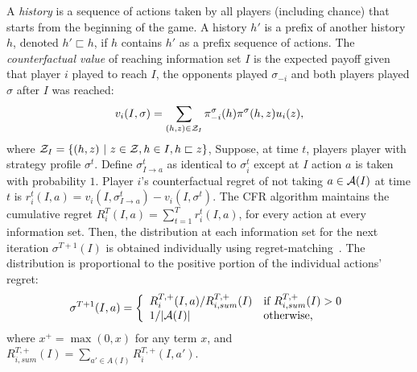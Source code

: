 A {\it history} is a sequence of actions taken by all players (including chance) that starts from the beginning of the game.
A history $h'$ is a prefix of another history $h$, denoted $h' \sqsubset h$, if $h$ contains $h'$ as a prefix sequence of actions.
The {\it counterfactual value} of reaching information set $I$ is the expected payoff given that player $i$ played to reach $I$, the opponents played
$\sigma_{-i}$ and both players played $\sigma$ after $I$ was reached:
\begin{equation}
\label{eq:cfv}
v_i(I,\sigma) = \sum_{(h,z) \in \mathcal{Z}_I} \pi^{\sigma}_{-i}(h) \pi^{\sigma}(h,z) u_i(z),
\end{equation}
where $\mathcal{Z}_I = \{ (h,z)~|~z \in \mathcal{Z}, h \in I, h \sqsubset z \}$, 
Suppose, at time $t$, players player with strategy profile $\sigma^t$.
Define $\sigma^t_{I \rightarrow a}$ as identical to $\sigma^t_i$ except at $I$ action $a$ is taken with probability $1$.
Player $i$'s counterfactual regret of not taking $a \in \mathcal{A}(I)$ at time $t$ is $r_i^t(I,a) = v_i(I, \sigma^t_{I \rightarrow a}) - v_i(I,\sigma^t)$.
The CFR algorithm maintains the cumulative regret $R_i^T(I,a) = \sum_{t=1}^T r_i^t(I,a)$, for every action at every information set.
Then, the distribution at each information set for the next iteration $\sigma^{T+1}(I)$ is obtained individually using
regret-matching~\cite{Hart00}. The distribution is proportional to the positive portion of the individual actions' regret:
\begin{equation*}
\label{eq:rm}
\sigma^{T+1}(I,a) = \left\{
\begin{array}{ll}
R_i^{T,+}(I,a) / R^{T,+}_{i,sum}(I) & \mbox{if } R^{T,+}_{i,sum}(I) > 0 \\
1 / |\mathcal{A}(I)|                   & \mbox{otherwise,}
\end{array} \right.
\end{equation*}
where $x^+ = \max(0,x)$ for any term $x$, and $R^{T,+}_{i,sum}(I) = \sum_{a' \in A(I)} R_i^{T,+}(I,a')$.
